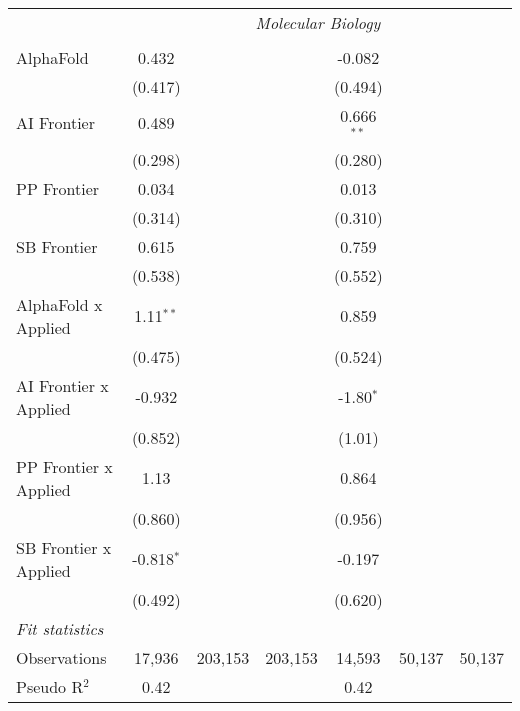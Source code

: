 \begin{tabular}{lcccccc}
 & \multicolumn{6}{c}{\textit{Molecular Biology}} \\ \\
   AlphaFold             & 0.432        &         &         & -0.082       &        &   \\   
                         & (0.417)      &         &         & (0.494)      &        &   \\   
   AI Frontier           & 0.489        &         &         & 0.666$^{**}$ &        &   \\   
                         & (0.298)      &         &         & (0.280)      &        &   \\   
   PP Frontier           & 0.034        &         &         & 0.013        &        &   \\   
                         & (0.314)      &         &         & (0.310)      &        &   \\   
   SB Frontier           & 0.615        &         &         & 0.759        &        &   \\   
                         & (0.538)      &         &         & (0.552)      &        &   \\   
   AlphaFold x Applied   & 1.11$^{**}$  &         &         & 0.859        &        &   \\   
                         & (0.475)      &         &         & (0.524)      &        &   \\   
   AI Frontier x Applied & -0.932       &         &         & -1.80$^{*}$  &        &   \\   
                         & (0.852)      &         &         & (1.01)       &        &   \\   
   PP Frontier x Applied & 1.13         &         &         & 0.864        &        &   \\   
                         & (0.860)      &         &         & (0.956)      &        &   \\   
   SB Frontier x Applied & -0.818$^{*}$ &         &         & -0.197       &        &   \\   
                         & (0.492)      &         &         & (0.620)      &        &   \\   
   \midrule
   \emph{Fit statistics}\\
   Observations          & 17,936       & 203,153 & 203,153 & 14,593       & 50,137 & 50,137\\  
   Pseudo R$^2$          & 0.42         &         &         & 0.42         &        & \\  
   

\end{tabular}
